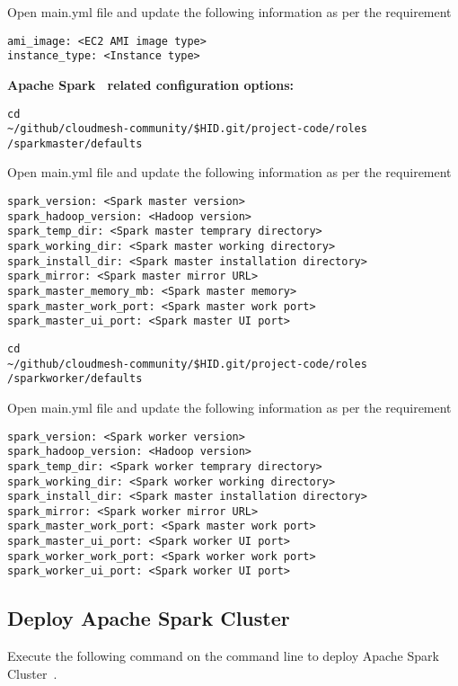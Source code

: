 Open main.yml file and update the following information as per the
requirement

\begin{verbatim}
ami_image: <EC2 AMI image type>
instance_type: <Instance type>
\end{verbatim}

\textbf{Apache Spark~\cite{hid-sp18-511-www-spark} related configuration options:}

\begin{verbatim}
cd
~/github/cloudmesh-community/$HID.git/project-code/roles
/sparkmaster/defaults
\end{verbatim}

Open main.yml file and update the following information as per the
requirement

\begin{verbatim}
spark_version: <Spark master version>
spark_hadoop_version: <Hadoop version>
spark_temp_dir: <Spark master temprary directory>
spark_working_dir: <Spark master working directory>
spark_install_dir: <Spark master installation directory>
spark_mirror: <Spark master mirror URL>
spark_master_memory_mb: <Spark master memory>
spark_master_work_port: <Spark master work port>
spark_master_ui_port: <Spark master UI port>
\end{verbatim}

\begin{verbatim}
cd
~/github/cloudmesh-community/$HID.git/project-code/roles
/sparkworker/defaults
\end{verbatim}

Open main.yml file and update the following information as per the
requirement

\begin{verbatim}
spark_version: <Spark worker version>
spark_hadoop_version: <Hadoop version>
spark_temp_dir: <Spark worker temprary directory>
spark_working_dir: <Spark worker working directory>
spark_install_dir: <Spark master installation directory>
spark_mirror: <Spark worker mirror URL>
spark_master_work_port: <Spark master work port>
spark_master_ui_port: <Spark worker UI port>
spark_worker_work_port: <Spark worker work port>
spark_worker_ui_port: <Spark worker UI port>
\end{verbatim}

\subsection{Deploy Apache Spark Cluster}

Execute the following command on the command line to deploy Apache
Spark Cluster~\cite{hid-sp18-511-www-spark}.

